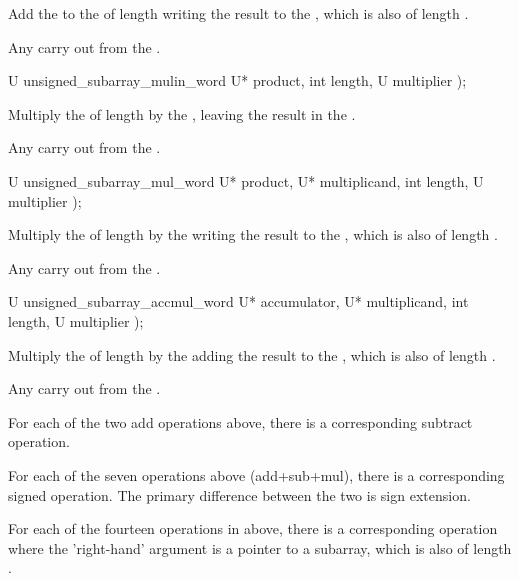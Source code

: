 \begin{addedblock}
\begin{itemdescr}
\effects Add the  to the  of length  writing the result to the , which is also of length .

\returns Any carry out from the .    
\end{itemdescr}

\begin{itemdecl}
U unsigned_subarray_mulin_word U* product, int length, U multiplier );    
\end{itemdecl}

\begin{itemdescr}
\effects Multiply the  of length  by the , leaving the result in the .

\returns Any carry out from the .    
\end{itemdescr}

\begin{itemdecl}
U unsigned_subarray_mul_word U* product, U* multiplicand, int length, U multiplier );    
\end{itemdecl}

\begin{itemdescr}
\effects Multiply the  of length  by the  writing the result to the , which is also of length .

\returns Any carry out from the .    
\end{itemdescr}

\begin{itemdecl}
U unsigned_subarray_accmul_word U* accumulator, U* multiplicand, int length, U multiplier );    
\end{itemdecl}

\begin{itemdescr}
\effects Multiply the  of length  by the  adding the result to the , which is also of length .

\returns Any carry out from the .    
\end{itemdescr}

For each of the two add operations above, there is a corresponding subtract operation.

For each of the seven operations above (add+sub+mul), there is a corresponding signed operation. The primary difference between the two is sign extension.

For each of the fourteen operations in above, there is a corresponding operation where the 'right-hand' argument is a pointer to a subarray, which is also of length .
\end{addedblock}

